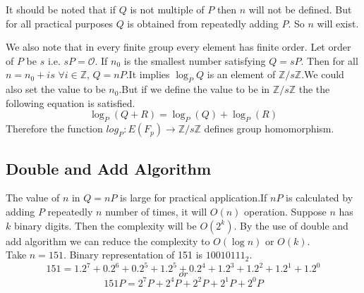 \documentclass[12pt,a4paper]{report}
\begin{document}
It should be noted that if $Q$ is not multiple of $P$ then $n$ will not be defined. But for all practical purposes $Q$ is obtained from repeatedly adding $P$. So $n$ will exist.

We also note that in every finite group every element has finite order. Let order of $P$ be $s$ i.e. $s P=\mathscr{O}$. If $n_0$ is the smallest number satisfying $Q=sP$. Then for all $n=n_0+is$ $ \forall i \in \mathbb{Z} $, $Q=nP$.It implies $\log_P Q$ is an element of  $\mathbb{Z}/s\mathbb{Z}$.We could also set the value to be $n_0$.But if we define the value to be in $\mathbb{Z}/s\mathbb{Z}$ the the following equation is satisfied.
$$\log_P(Q+R)=\log_P(Q)+\log_P(R)$$
Therefore the function
$log_P:E(F_p)\rightarrow \mathbb{Z}/s\mathbb{Z}$ defines group homomorphism.
\subsection{Double and Add Algorithm}
The value of $n$ in $Q=nP$ is large for practical application.If $nP$ is calculated by adding $P$ repeatedly $n$ number of times, it will $O(n)$ operation. Suppose $n$ has $k$ binary digits. Then the complexity will be $O(2^k)$. By the use of double and add algorithm we can reduce the complexity to $O(\log {n})$ or $O(k)$.\\
Take $n=151$. Binary representation of 151 is $10010111_2$.
$$151=1.2^7+0.2^6+0.2^5+1.2^5+0.2^4+1.2^3+1.2^2+1.2^1+1.2^0$$
$$or$$
$$151P = 2^7P+2^4P+2^2P+2^1P+2^0P$$
\cleardoublepage
\end{document}
